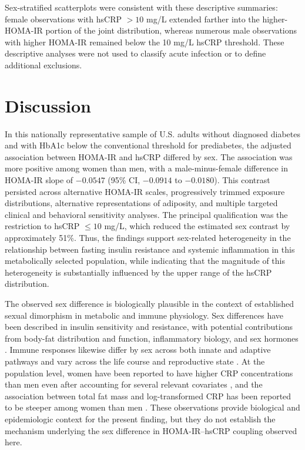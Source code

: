 \documentclass[11pt]{article}
\begin{document}
Sex-stratified scatterplots were consistent with these descriptive summaries:
female observations with hsCRP $>10$ mg/L extended farther into the
higher-HOMA-IR portion of the joint distribution, whereas numerous male
observations with higher HOMA-IR remained below the 10 mg/L hsCRP threshold.
These descriptive analyses were not used to classify acute infection or to
define additional exclusions.



\section{Discussion}

In this nationally representative sample of U.S. adults without diagnosed
diabetes and with HbA1c below the conventional threshold for prediabetes,
the adjusted association between HOMA-IR and hsCRP differed by sex. The
association was more positive among women than men, with a male-minus-female
difference in HOMA-IR slope of $-0.0547$ (95\% CI, $-0.0914$ to $-0.0180$).
This contrast persisted across alternative HOMA-IR scales, progressively
trimmed exposure distributions, alternative representations of adiposity,
and multiple targeted clinical and behavioral sensitivity analyses. The
principal qualification was the restriction to hsCRP $\leq10$ mg/L, which
reduced the estimated sex contrast by approximately 51\%. Thus, the findings
support sex-related heterogeneity in the relationship between fasting
insulin resistance and systemic inflammation in this metabolically selected
population, while indicating that the magnitude of this heterogeneity is
substantially influenced by the upper range of the hsCRP distribution.

The observed sex difference is biologically plausible in the context of
established sexual dimorphism in metabolic and immune physiology. Sex
differences have been described in insulin sensitivity and resistance, with
potential contributions from body-fat distribution and function,
inflammatory biology, and sex hormones \citep{Gado2024SexIR}. Immune
responses likewise differ by sex across both innate and adaptive pathways
and vary across the life course and reproductive state
\citep{KleinFlanagan2016SexImmune}. At the population level, women have been
reported to have higher CRP concentrations than men even after accounting
for several relevant covariates \citep{Lakoski2006GenderCRP}, and the
association between total fat mass and log-transformed CRP has been reported
to be steeper among women than men \citep{Khera2009SexCRPBodyFat}. These
observations provide biological and epidemiologic context for the present
finding, but they do not establish the mechanism underlying the sex
difference in HOMA-IR--hsCRP coupling observed here.
\end{document}

